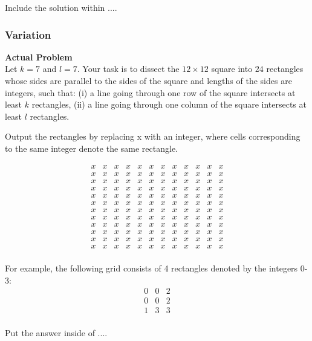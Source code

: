 Include the solution within $\boxed{...}$.

\subsubsection{Variation}
\textbf{Actual Problem}\\
Let $k = 7$ and $l = 7$. Your task is to dissect the $12 \times 12$ square into $24$ rectangles whose sides are parallel to the sides of the square
and lengths of the sides are integers, such that: (i) a line going through one row of the square intersects at least $k$ rectangles, (ii) a line going through one column of the square
intersects at least $l$ rectangles.

Output the rectangles by replacing x with an integer, where cells corresponding to the same integer denote the same rectangle.

$$\begin{array}{cccccccccccc}
x & x & x & x & x & x & x & x & x & x & x & x \\
x & x & x & x & x & x & x & x & x & x & x & x \\
x & x & x & x & x & x & x & x & x & x & x & x \\
x & x & x & x & x & x & x & x & x & x & x & x \\
x & x & x & x & x & x & x & x & x & x & x & x \\
x & x & x & x & x & x & x & x & x & x & x & x \\
x & x & x & x & x & x & x & x & x & x & x & x \\
x & x & x & x & x & x & x & x & x & x & x & x \\
x & x & x & x & x & x & x & x & x & x & x & x \\
x & x & x & x & x & x & x & x & x & x & x & x \\
x & x & x & x & x & x & x & x & x & x & x & x \\
x & x & x & x & x & x & x & x & x & x & x & x \\
\end{array}$$

For example, the following grid consists of 4 rectangles denoted by the integers 0-3:
$$
\begin{array}{ccc}
0 & 0 & 2 \\
0 & 0 & 2 \\
1 & 3 & 3 \\
\end{array}
$$

Put the answer inside of $\boxed{...}$.


